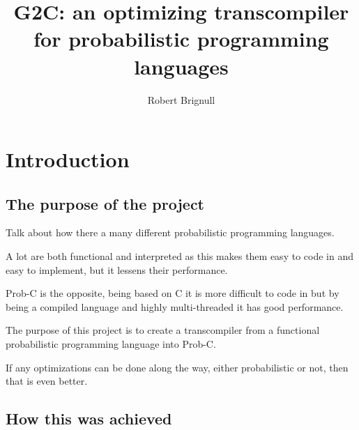 \documentclass[a4paper]{article}
\title{G2C: an optimizing transcompiler for probabilistic programming languages}
\author{Robert Brignull}
\date{ }
\begin{document}
\maketitle


\section{Introduction}




\subsection{The purpose of the project}

Talk about how there a many different probabilistic programming languages.

A lot are both functional and interpreted as this makes them easy to code in and easy to implement, but it lessens their performance.

Prob-C is the opposite, being based on C it is more difficult to code in but by being a compiled language and highly multi-threaded it has good performance.

The purpose of this project is to create a transcompiler from a functional probabilistic programming language into Prob-C.

If any optimizations can be done along the way, either probabilistic or not, then that is even better.




\subsection{How this was achieved}
\end{document}
